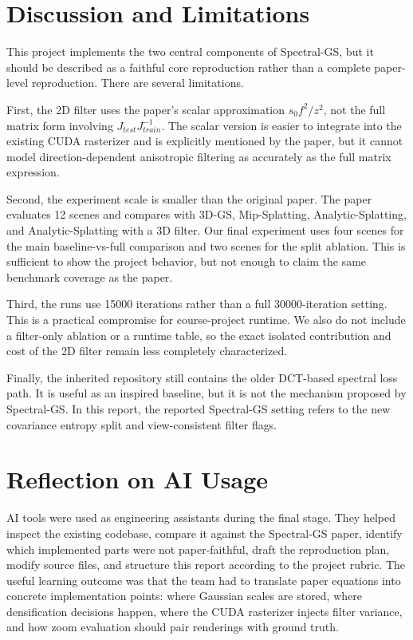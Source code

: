 \documentclass{article}
\begin{document}
\section{Discussion and Limitations}
\label{sec:discussion}

This project implements the two central components of Spectral-GS, but it should be described as a faithful core reproduction rather than a complete paper-level reproduction. There are several limitations.

First, the 2D filter uses the paper's scalar approximation $s_0 f^2/z^2$, not the full matrix form involving $J_{test}J_{train}^{-1}$. The scalar version is easier to integrate into the existing CUDA rasterizer and is explicitly mentioned by the paper, but it cannot model direction-dependent anisotropic filtering as accurately as the full matrix expression.

Second, the experiment scale is smaller than the original paper. The paper evaluates 12 scenes and compares with 3D-GS, Mip-Splatting, Analytic-Splatting, and Analytic-Splatting with a 3D filter. Our final experiment uses four scenes for the main baseline-vs-full comparison and two scenes for the split ablation. This is sufficient to show the project behavior, but not enough to claim the same benchmark coverage as the paper.

Third, the runs use 15000 iterations rather than a full 30000-iteration setting. This is a practical compromise for course-project runtime. We also do not include a filter-only ablation or a runtime table, so the exact isolated contribution and cost of the 2D filter remain less completely characterized.

Finally, the inherited repository still contains the older DCT-based spectral loss path. It is useful as an inspired baseline, but it is not the mechanism proposed by Spectral-GS. In this report, the reported Spectral-GS setting refers to the new covariance entropy split and view-consistent filter flags.

\section{Reflection on AI Usage}
\label{sec:reflection}

AI tools were used as engineering assistants during the final stage. They helped inspect the existing codebase, compare it against the Spectral-GS paper, identify which implemented parts were not paper-faithful, draft the reproduction plan, modify source files, and structure this report according to the project rubric. The useful learning outcome was that the team had to translate paper equations into concrete implementation points: where Gaussian scales are stored, where densification decisions happen, where the CUDA rasterizer injects filter variance, and how zoom evaluation should pair renderings with ground truth.
\end{document}
